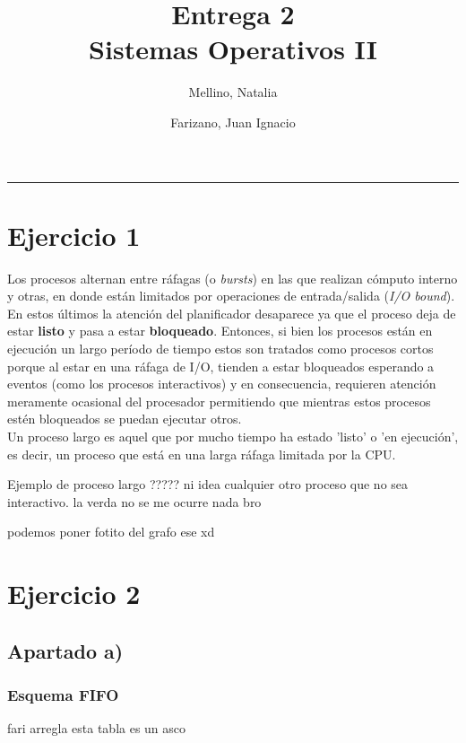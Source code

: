 \documentclass[11pt]{article}
\title{
    Entrega 2 \\
    \large Sistemas Operativos II}
\author{Mellino, Natalia \and Farizano, Juan Ignacio}
\date{}
\begin{document}
\maketitle

\noindent\rule{\textwidth}{1pt}

\section*{Ejercicio 1}

Los procesos alternan entre ráfagas (o \emph{bursts}) en las que realizan cómputo interno
y otras, en donde están limitados por operaciones de entrada/salida (\emph{I/O bound}). 
En estos últimos la atención del planificador desaparece ya que el proceso deja de
estar \textbf{listo} y pasa a estar \textbf{bloqueado}. Entonces, si bien los procesos están en ejecución un largo período de tiempo estos
son tratados como procesos cortos porque al estar en una ráfaga de I/O, tienden
a estar bloqueados esperando a eventos (como los procesos interactivos) y en consecuencia,
requieren atención meramente ocasional del procesador permitiendo que mientras estos
procesos estén bloqueados se puedan ejecutar otros. \\ %

Un proceso largo es aquel que por mucho tiempo ha estado 'listo' o 'en ejecución', es decir,
un proceso que está en una larga ráfaga limitada por la CPU.

Ejemplo de proceso largo ????? ni idea
cualquier otro proceso que no sea interactivo. la verda no se me ocurre nada bro

podemos poner fotito del grafo ese xd

\section*{Ejercicio 2}

\subsection*{Apartado a)}

\subsubsection*{Esquema FIFO}

fari arregla esta tabla es un asco
\end{document}
